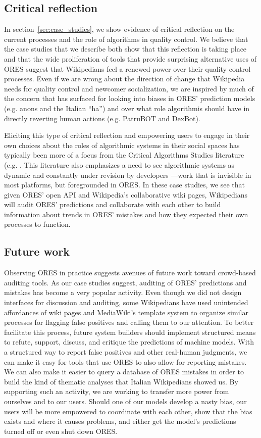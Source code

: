 \subsection{Critical reflection}
In section~\ref{sec:case_studies}, we show evidence of critical reflection on the current processes and the role of algorithms in quality control.  We believe that the case studies that we describe both show that this reflection is taking place and that the wide proliferation of tools that provide surprising alternative uses of ORES suggest that Wikipedians feel a renewed power over their quality control processes.  Even if we are wrong about the direction of change that Wikipedia needs for quality control and newcomer socialization, we are inspired by much of the concern that has surfaced for looking into biases in ORES' prediction models (e.g. anons and the Italian ``ha'') and over what role algorithmis should have in directly reverting human actions (e.g. PatruBOT and DexBot).

Eliciting this type of critical reflection and empowering users to engage in their own choices about the roles of algorithmic systems in their social spaces has typically been more of a focus from the Critical Algorithms Studies literature (e.g. \cite{barocas2013governing, kitchin2017thinking}. This literature also emphasizes a need to see algorithmic systems as dynamic and constantly under revision by developers \cite{seaver2017algorithms}---work that is invisible in most platforms, but foregrounded in ORES. In these case studies, we see that given ORES' open API and Wikipedia's collaborative wiki pages, Wikipedians will audit ORES' predictions and collaborate with each other to build information about trends in ORES' mistakes and how they expected their own processes to function.

\subsection{Future work}
Observing ORES in practice suggests avenues of future work toward crowd-based auditing tools.  As our case studies suggest, auditing of ORES' predictions and mistakes has become a very popular activity. Even though we did not design interfaces for discussion and auditing, some Wikipedians have used unintended affordances of wiki pages and MediaWiki's template system to organize similar processes for flagging false positives and calling them to our attention.  To better facilitate this process, future system builders should implement structured means to refute, support, discuss, and critique the predictions of machine models.  With a structured way to report false positives and other real-human judgments, we can make it easy for tools that use ORES to also allow for reporting mistakes.  We can also make it easier to query a database of ORES mistakes in order to build the kind of thematic analyses that Italian Wikipedians showed us.  By supporting such an activity, we are working to transfer more power from ourselves and to our users.  Should one of our models develop a nasty bias, our users will be more empowered to coordinate with each other, show that the bias exists and where it causes problems, and either get the model's predictions turned off or even shut down ORES.

